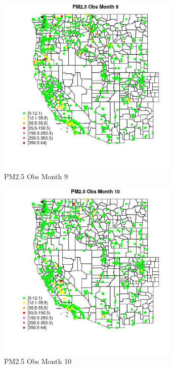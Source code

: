 \begin{figure} 
\centering  
\includegraphics[width=0.77\textwidth]{Code_Outputs/Report_ML_input_PM25_Step4_part_e_de_duplicated_aves_compiled_2019-05-21wNAs_MapObsMo9PM25_Obs.jpg} 
\caption{\label{fig:Report_ML_input_PM25_Step4_part_e_de_duplicated_aves_compiled_2019-05-21wNAsMapObsMo9PM25_Obs}PM2.5 Obs Month 9} 
\end{figure} 
 

\clearpage 

\begin{figure} 
\centering  
\includegraphics[width=0.77\textwidth]{Code_Outputs/Report_ML_input_PM25_Step4_part_e_de_duplicated_aves_compiled_2019-05-21wNAs_MapObsMo10PM25_Obs.jpg} 
\caption{\label{fig:Report_ML_input_PM25_Step4_part_e_de_duplicated_aves_compiled_2019-05-21wNAsMapObsMo10PM25_Obs}PM2.5 Obs Month 10} 
\end{figure} 
 

